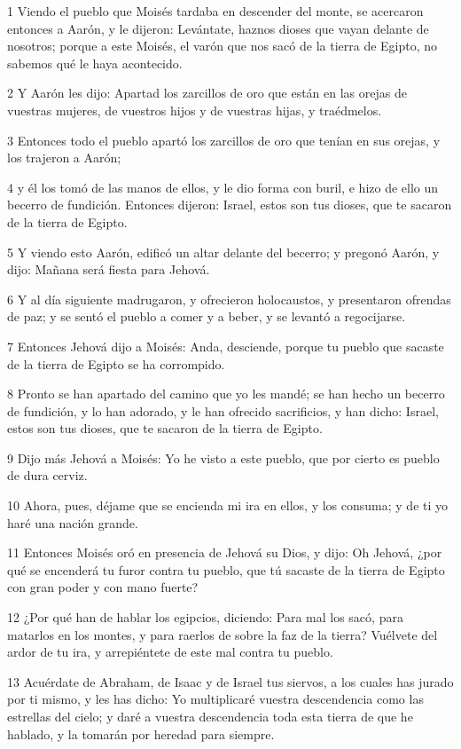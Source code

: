 \par 1 Viendo el pueblo que Moisés tardaba en descender del monte, se acercaron entonces a Aarón, y le dijeron: Levántate, haznos dioses que vayan delante de nosotros; porque a este Moisés, el varón que nos sacó de la tierra de Egipto, no sabemos qué le haya acontecido.
\par 2 Y Aarón les dijo: Apartad los zarcillos de oro que están en las orejas de vuestras mujeres, de vuestros hijos y de vuestras hijas, y traédmelos.
\par 3 Entonces todo el pueblo apartó los zarcillos de oro que tenían en sus orejas, y los trajeron a Aarón;
\par 4 y él los tomó de las manos de ellos, y le dio forma con buril, e hizo de ello un becerro de fundición. Entonces dijeron: Israel, estos son tus dioses, que te sacaron de la tierra de Egipto.
\par 5 Y viendo esto Aarón, edificó un altar delante del becerro; y pregonó Aarón, y dijo: Mañana será fiesta para Jehová.
\par 6 Y al día siguiente madrugaron, y ofrecieron holocaustos, y presentaron ofrendas de paz; y se sentó el pueblo a comer y a beber, y se levantó a regocijarse.
\par 7 Entonces Jehová dijo a Moisés: Anda, desciende, porque tu pueblo que sacaste de la tierra de Egipto se ha corrompido.
\par 8 Pronto se han apartado del camino que yo les mandé; se han hecho un becerro de fundición, y lo han adorado, y le han ofrecido sacrificios, y han dicho: Israel, estos son tus dioses, que te sacaron de la tierra de Egipto.
\par 9 Dijo más Jehová a Moisés: Yo he visto a este pueblo, que por cierto es pueblo de dura cerviz.
\par 10 Ahora, pues, déjame que se encienda mi ira en ellos, y los consuma; y de ti yo haré una nación grande.
\par 11 Entonces Moisés oró en presencia de Jehová su Dios, y dijo: Oh Jehová, ¿por qué se encenderá tu furor contra tu pueblo, que tú sacaste de la tierra de Egipto con gran poder y con mano fuerte?
\par 12 ¿Por qué han de hablar los egipcios, diciendo: Para mal los sacó, para matarlos en los montes, y para raerlos de sobre la faz de la tierra? Vuélvete del ardor de tu ira, y arrepiéntete de este mal contra tu pueblo.
\par 13 Acuérdate de Abraham, de Isaac y de Israel tus siervos, a los cuales has jurado por ti mismo, y les has dicho: Yo multiplicaré vuestra descendencia como las estrellas del cielo; y daré a vuestra descendencia toda esta tierra de que he hablado, y la tomarán por heredad para siempre.
